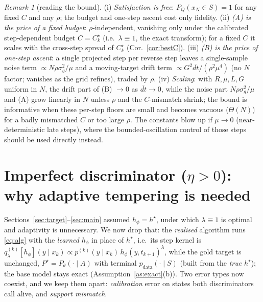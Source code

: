 \documentclass[11pt]{article}
\newcommand{\hs}{h^\star}
\theoremstyle{plain}
\theoremstyle{definition}
\theoremstyle{remark}
\newtheorem{remark}{Remark}
\begin{document}
\begin{remark}[reading the bound]
\label{rem:read}
\textup{(i)} \emph{Satisfaction is free}: $P_Q(x_N\in S)=1$ for any fixed $C$ and any
$\rho$; the budget and one-step ascent cost only fidelity.
\textup{(ii)} \emph{(A) is the price of a fixed budget}: $\rho$-independent, vanishing
only under the calibrated step-dependent budget $C=C^\star_k$ (i.e.\ $\lambda\equiv1$,
the exact transform); for a fixed $C$ it scales with the cross-step spread of $C^\star_k$
(Cor.~\ref{cor:bestC}).
\textup{(iii)} \emph{(B) is the price of one-step ascent}: a single projected step per
reverse step leaves a single-sample noise term $\propto N\rho\sigma_g^2/\mu$ and a
moving-target drift term $\propto G^2\overline{dt}/(\rho^2\mu^4)$ (no $N$ factor; vanishes
as the grid refines), traded by $\rho$.
\textup{(iv)} \emph{Scaling}: with $R,\mu,L,G$ uniform in $N$, the drift part of (B)
$\to0$ as $\overline{dt}\to0$, while the noise part $N\rho\sigma_g^2/\mu$ and (A) grow
linearly in $N$ unless $\rho$ and the $C$-mismatch shrink; the bound is informative when
these per-step floors are small and becomes vacuous ($\Theta(N)$) for a badly mismatched
$C$ or too large $\rho$. The constants blow up if $\mu\to0$ (near-deterministic late steps),
where the bounded-oscillation control of those steps should be used directly instead.
\end{remark}


\section{Imperfect discriminator ($\eta>0$): why adaptive tempering is needed}
\label{sec:eta}

Sections~\ref{sec:target}--\ref{sec:main} assumed $h_\phi=\hs$, under which $\lambda\equiv1$
is optimal and adaptivity is unnecessary. We now drop that: the \emph{realised} algorithm
runs \eqref{eq:alg} with the \emph{learned} $h_\phi$ in place of $\hs$, i.e.\ its step kernel
is $q^{(k)}_\lambda[h_\phi](y\mid x_k)\propto p^{(k)}(y\mid x_k)\,h_\phi(y,t_{k+1})^{\lambda}$,
while the gold target is unchanged, $P^\star=P_\theta(\cdot\mid A)$ with terminal
$p_{\text{data}}(\cdot\mid S)$ (built from the \emph{true} $\hs$); the base model stays exact
(Assumption~\ref{as:exact}(b)). Two error types now coexist, and we keep them apart:
\emph{calibration} error on states both discriminators call alive, and \emph{support mismatch}.
\end{document}
